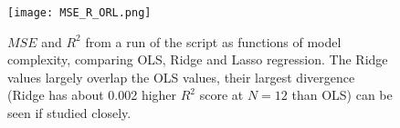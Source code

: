 \documentclass[reprint,english,notitlepage]{revtex4-1}  %
\begin{document}
\begin{figure}[h!]
    \centering
    \texttt{[image: MSE\_R\_ORL.png]}
    \caption{$MSE$ and $R^2$ from a run of the script as functions of model complexity, comparing OLS, Ridge and Lasso regression. The Ridge values largely overlap the OLS values, their largest divergence (Ridge has about 0.002 higher $R^2$ score at $N = 12$ than OLS) can be seen if studied closely.}
    \label{fig:terrain_misc}
\end{figure}
\end{document}

